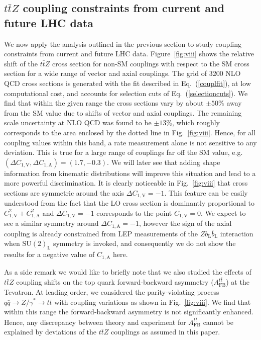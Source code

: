 \documentclass{JHEP3}
\def\ttbZ{t\bar{t}Z}
\def\ttb{t\bar{t}}
\def\ConeA{C_{1,\mathrm{A}}}
\def\ConeV{C_{1,\mathrm{V}}}
\begin{document}
\subsection{$\ttbZ$ coupling constraints from current and future LHC data}
\label{sect:CouplLimits}

We now apply the analysis outlined in the previous section to study coupling constraints from current and future LHC data.
Figure~\ref{fig:viii} shows the relative shift of the $\ttbZ$ cross section for non-SM couplings with respect to the SM cross section 
for a wide range of vector and axial couplings. 
The grid of 3200 NLO QCD cross sections is generated with the fit described in Eq.~(\ref{couplfit}), at low computational cost, 
and accounts for selection cuts of Eq.~(\ref{selectioncuts}).
We find that within the given range the cross sections vary by about $\pm 50\%$ away from the SM value due to shifts of vector and axial couplings.
The remaining scale uncertainty at NLO QCD was found to be $\pm 13\%$, which roughly corresponds to the area enclosed by the dotted line in Fig.~\ref{fig:viii}.
Hence, for all coupling values within this band, a rate measurement alone is not sensitive to any deviation.
This is true for a large range of couplings far off the SM value, e.g. $(\Delta\ConeV,\Delta\ConeA)=(1.7,-0.3)$.
We will later see that adding shape information from kinematic distributions will improve this situation and lead to a more powerful discrimination. 
It is clearly noticeable in Fig.~\ref{fig:viii} that cross sections are symmetric around the axis $\Delta\ConeV=-1$. 
This feature can be easily understood from the fact that the LO cross section is dominantly proportional to 
$\ConeV^2+\ConeA^2$ and $\Delta\ConeV=-1$ corresponds to the point $\ConeV=0$.
We expect to see a similar symmetry around $\Delta\ConeA=-1$, however  the sign of the axial coupling is already constrained from 
LEP measurements of the $Zb_\mathrm{L}\bar{b}_\mathrm{L}$ interaction when $\mathrm{SU(2)}_\mathrm{L}$ symmetry is invoked, and consequently we do not show the results for 
a negative value of $\ConeA$ here.


As a side remark we would like to briefly note that we also studied the effects of $\ttbZ$ coupling shifts on the top quark forward-backward asymmetry ($A_\mathrm{FB}^{\ttb}$) 
at the Tevatron.
At leading order, we considered the parity-violating process $q \bar{q} \to Z/\gamma^* \to \ttb$ with coupling variations as shown in Fig.~\ref{fig:viii}.
We find that within this range the forward-backward asymmetry is not significantly enhanced.
Hence, any discrepancy between theory and experiment for $A_\mathrm{FB}^{\ttb}$ cannot be explained by deviations of the $\ttbZ$ couplings as
assumed in this paper.
\end{document}
